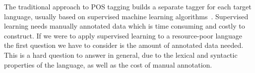 \documentclass[12pt,twoside,final,hidelinks]{ltthesis}
\theoremstyle{definition}
\begin{document}
The traditional approach to POS tagging builds a separate tagger for each target language, usually based on supervised machine learning algorithms~\cite{TNTTagger,Brill95transformation,Toutanova:2003}. %
Supervised learning needs manually annotated data which is time consuming and costly to construct. If we were to apply supervised learning to a resource-poor language 
the first question we have to consider is the amount of annotated data needed. This is a hard question to answer in general, due to the lexical and syntactic properties of the language, %
 as well as the cost of manual annotation. 
\end{document}
